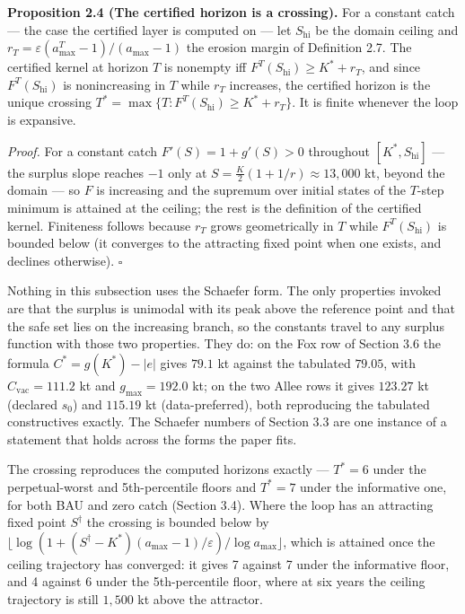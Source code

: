 \textbf{Proposition 2.4 (The certified horizon is a crossing).} For a
constant catch --- the case the certified layer is computed on --- let
\(S_{\mathrm{hi}}\) be the domain ceiling and
\(r_T = \varepsilon(a_{\max}^T-1)/(a_{\max}-1)\) the erosion margin of
Definition 2.7. The certified kernel at horizon \(T\) is nonempty iff
\(F^T(S_{\mathrm{hi}}) \ge K^* + r_T\), and since \(F^T(S_{\mathrm{hi}})\)
is nonincreasing in \(T\) while \(r_T\) increases, the certified horizon is
the unique crossing
\(T^* = \max\{T : F^T(S_{\mathrm{hi}}) \ge K^* + r_T\}\). It is finite
whenever the loop is expansive.

\emph{Proof.} For a constant catch \(F'(S) = 1 + g'(S) > 0\) throughout
\([K^*, S_{\mathrm{hi}}]\) --- the surplus slope reaches \(-1\) only at
\(S = \frac{K}{2}(1 + 1/r) \approx 13{,}000\) kt, beyond the domain --- so
\(F\) is increasing and the supremum over initial states of the \(T\)-step
minimum is attained at the ceiling; the rest is the definition of the certified
kernel. Finiteness follows because \(r_T\) grows
geometrically in \(T\) while \(F^T(S_{\mathrm{hi}})\) is bounded below (it
converges to the attracting fixed point when one exists, and declines
otherwise). \ensuremath{\square}

Nothing in this subsection uses the Schaefer form. The only properties
invoked are that the surplus is unimodal with its peak above the reference
point and that the safe set lies on the increasing branch, so the constants
travel to any surplus function with those two properties. They do: on the
Fox row of Section 3.6 the formula \(C^* = g(K^*) - |e|\) gives
\(79.1\) kt against the tabulated \(79.05\), with
\(C_{\mathrm{vac}} = 111.2\) kt and \(g_{\max} = 192.0\) kt; on the
two Allee rows it gives \(123.27\) kt (declared \(s_0\)) and
\(115.19\) kt (data-preferred), both reproducing the tabulated constructives
exactly. The Schaefer numbers of Section 3.3 are one instance of a statement
that holds across the forms the paper fits.

The crossing reproduces the computed horizons exactly --- \(T^* = 6\) under
the perpetual-worst and 5th-percentile floors and \(T^* = 7\) under the
informative one, for both BAU and zero catch (Section 3.4). Where the loop has
an attracting fixed point \(S^\dagger\) the crossing is bounded below by
\(\lfloor\log(1 + (S^\dagger-K^*)(a_{\max}-1)/\varepsilon)/\log
a_{\max}\rfloor\), which is attained once the ceiling trajectory has
converged: it gives 7 against 7 under the informative floor, and 4 against 6
under the 5th-percentile floor, where at six years the ceiling trajectory is
still \(1{,}500\) kt above the attractor.

